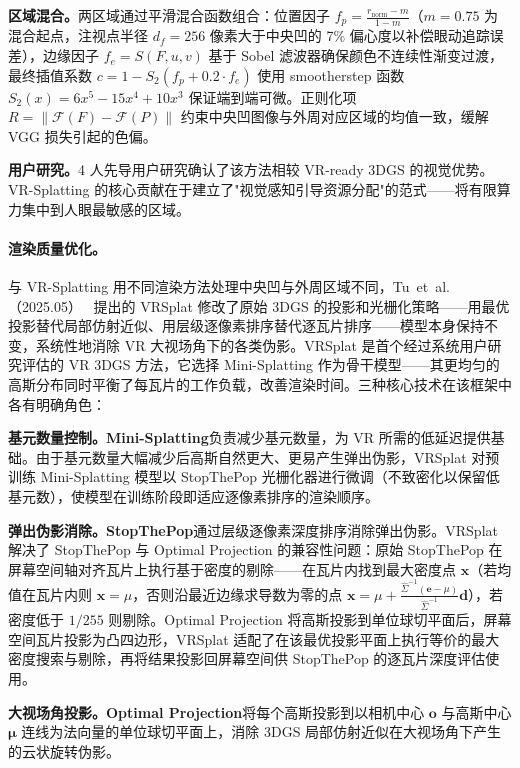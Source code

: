 \textbf{区域混合。}两区域通过平滑混合函数组合：位置因子 $f_p = \frac{r_{\text{norm}} - m}{1 - m}$（$m=0.75$ 为混合起点，注视点半径 $d_f=256$ 像素大于中央凹的 7\% 偏心度以补偿眼动追踪误差），边缘因子 $f_e = S(F, u, v)$ 基于 Sobel 滤波器确保颜色不连续性渐变过渡，最终插值系数 $c = 1 - S_2(f_p + 0.2 \cdot f_e)$ 使用 smootherstep 函数 $S_2(x) = 6x^5 - 15x^4 + 10x^3$ 保证端到端可微。正则化项 $R = \|\mathcal{F}(F) - \mathcal{F}(P)\|$ 约束中央凹图像与外周对应区域的均值一致，缓解 VGG 损失引起的色偏。

\textbf{用户研究。}4 人先导用户研究确认了该方法相较 VR-ready 3DGS 的视觉优势。VR-Splatting 的核心贡献在于建立了"视觉感知引导资源分配"的范式——将有限算力集中到人眼最敏感的区域。

\paragraph{渲染质量优化。}

与 VR-Splatting 用不同渲染方法处理中央凹与外周区域不同，Tu~et~al.（2025.05）~\cite{2505_10144} 提出的 VRSplat 修改了原始 3DGS 的投影和光栅化策略——用最优投影替代局部仿射近似、用层级逐像素排序替代逐瓦片排序——模型本身保持不变，系统性地消除 VR 大视场角下的各类伪影。VRSplat 是首个经过系统用户研究评估的 VR 3DGS 方法，它选择 Mini-Splatting 作为骨干模型——其更均匀的高斯分布同时平衡了每瓦片的工作负载，改善渲染时间。三种核心技术在该框架中各有明确角色：

\textbf{基元数量控制。}\textbf{Mini-Splatting}负责减少基元数量，为 VR 所需的低延迟提供基础。由于基元数量大幅减少后高斯自然更大、更易产生弹出伪影，VRSplat 对预训练 Mini-Splatting 模型以 StopThePop 光栅化器进行微调（不致密化以保留低基元数），使模型在训练阶段即适应逐像素排序的渲染顺序。

\textbf{弹出伪影消除。}\textbf{StopThePop}通过层级逐像素深度排序消除弹出伪影。VRSplat 解决了 StopThePop 与 Optimal Projection 的兼容性问题：原始 StopThePop 在屏幕空间轴对齐瓦片上执行基于密度的剔除——在瓦片内找到最大密度点 $\mathbf{x}$（若均值在瓦片内则 $\mathbf{x}=\mu$，否则沿最近边缘求导数为零的点 $\mathbf{x} = \mu + \frac{\hat{\Sigma}^{-1}(\mathbf{e} - \mu)}{\hat{\Sigma}^{-1}} \mathbf{d}$），若密度低于 $1/255$ 则剔除。Optimal Projection 将高斯投影到单位球切平面后，屏幕空间瓦片投影为凸四边形，VRSplat 适配了在该最优投影平面上执行等价的最大密度搜索与剔除，再将结果投影回屏幕空间供 StopThePop 的逐瓦片深度评估使用。

\textbf{大视场角投影。}\textbf{Optimal Projection}将每个高斯投影到以相机中心 $\mathbf{o}$ 与高斯中心 $\boldsymbol{\mu}$ 连线为法向量的单位球切平面上，消除 3DGS 局部仿射近似在大视场角下产生的云状旋转伪影。

